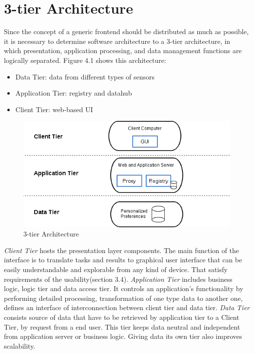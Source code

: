 \section{3-tier Architecture}
Since the concept of a generic frontend should be distributed as much as possible, it is necessary to determine software architecture 
to a 3-tier architecture, in which presentation, application processing, and data management functions are logically separated.
Figure 4.1 shows this architecture:
\begin{itemize}
\item Data Tier: data from different types of sensors
\item Application Tier: registry and datahub
\item Client Tier: web-based UI
\end{itemize} 
\begin{figure}[!ht]
\centering
\includegraphics[scale=0.7]{images/3tier.png}   
\caption[3-tier Architecture]{3-tier Architecture}
\label{img:3-tier Architecture}                           
\end{figure}
\emph{Client Tier} hosts the presentation layer components. The main function of the interface is to translate tasks and results to graphical user interface that can be easily understandable and explorable from any kind of device. That satisfy requirements of the usability(section 3.4).
\newline
\emph{Application Tier} includes business logic, logic tier and data access tier. It controls an application's functionality by performing detailed processing, transformation of one type data to another one, defines an interface of interconnection between client tier and data tier.
\newline
\emph{Data Tier} consists source of data that have to be retrieved by application tier to a Client Tier, by request from a end user. This tier keeps data neutral and independent from application server or business logic. Giving data its own tier also improves scalability. 
